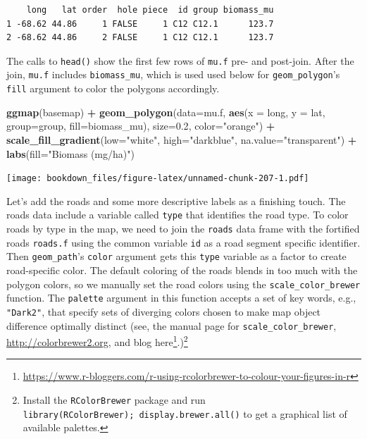 \documentclass[
]{krantz}
\makeatletter
\newenvironment{Shaded}{\begin{snugshade}}{\end{snugshade}}
\newcommand{\DataTypeTok}[1]{\textcolor[rgb]{0.27,0.27,0.27}{#1}}
\newcommand{\FloatTok}[1]{\textcolor[rgb]{0.06,0.06,0.06}{#1}}
\newcommand{\KeywordTok}[1]{\textcolor[rgb]{0.27,0.27,0.27}{\textbf{#1}}}
\newcommand{\NormalTok}[1]{#1}
\newcommand{\OperatorTok}[1]{\textcolor[rgb]{0.43,0.43,0.43}{\textbf{#1}}}
\newcommand{\StringTok}[1]{\textcolor[rgb]{0.5,0.5,0.5}{#1}}
\renewcommand{\href}[2]{#2\footnote{\url{#1}}}
\newenvironment{kframe}{%
\medskip{}
\setlength{\fboxsep}{.8em}
 \def\at@end@of@kframe{}%
 \ifinner\ifhmode%
  \def\at@end@of@kframe{\end{minipage}}%
  \begin{minipage}{\columnwidth}%
 \fi\fi%
 \def\FrameCommand##1{\hskip\@totalleftmargin \hskip-\fboxsep
 \colorbox{shadecolor}{##1}\hskip-\fboxsep
     \hskip-\linewidth \hskip-\@totalleftmargin \hskip\columnwidth}%
 \MakeFramed {\advance\hsize-\width
   \@totalleftmargin\z@ \linewidth\hsize
   \@setminipage}}%
 {\par\unskip\endMakeFramed%
 \at@end@of@kframe}
\renewenvironment{Shaded}{\begin{kframe}}{\end{kframe}}
\makeatother
\begin{document}
\begin{verbatim}
    long   lat order  hole piece  id group biomass_mu
1 -68.62 44.86     1 FALSE     1 C12 C12.1      123.7
2 -68.62 44.86     2 FALSE     1 C12 C12.1      123.7
\end{verbatim}

The calls to \texttt{head()} show the first few rows of \texttt{mu.f} pre- and post-join. After the join, \texttt{mu.f} includes \texttt{biomass\_mu}, which is used used below for \texttt{geom\_polygon}'s \texttt{fill} argument to color the polygons accordingly.

\begin{Shaded}
\begin{Highlighting}[]
\KeywordTok{ggmap}\NormalTok{(basemap) }\OperatorTok{+}
\StringTok{    }\KeywordTok{geom\_polygon}\NormalTok{(}\DataTypeTok{data=}\NormalTok{mu.f, }\KeywordTok{aes}\NormalTok{(}\DataTypeTok{x =}\NormalTok{ long, }\DataTypeTok{y =}\NormalTok{ lat, }
                                \DataTypeTok{group=}\NormalTok{group, }\DataTypeTok{fill=}\NormalTok{biomass\_mu), }
                 \DataTypeTok{size=}\FloatTok{0.2}\NormalTok{, }\DataTypeTok{color=}\StringTok{"orange"}\NormalTok{) }\OperatorTok{+}
\StringTok{    }\KeywordTok{scale\_fill\_gradient}\NormalTok{(}\DataTypeTok{low=}\StringTok{"white"}\NormalTok{, }\DataTypeTok{high=}\StringTok{"darkblue"}\NormalTok{, }
                        \DataTypeTok{na.value=}\StringTok{"transparent"}\NormalTok{) }\OperatorTok{+}
\StringTok{    }\KeywordTok{labs}\NormalTok{(}\DataTypeTok{fill=}\StringTok{"Biomass (mg/ha)"}\NormalTok{)}
\end{Highlighting}
\end{Shaded}

\texttt{[image: bookdown\_files/figure-latex/unnamed-chunk-207-1.pdf]}

Let's add the roads and some more descriptive labels as a finishing touch. The roads data include a variable called \texttt{type} that identifies the road type. To color roads by type in the map, we need to join the \texttt{roads} data frame with the fortified roads \texttt{roads.f} using the common variable \texttt{id} as a road segment specific identifier. Then \texttt{geom\_path}'s \texttt{color} argument gets this \texttt{type} variable as a factor to create road-specific color. The default coloring of the roads blends in too much with the polygon colors, so we manually set the road colors using the \texttt{scale\_color\_brewer} function. The \texttt{palette} argument in this function accepts a set of key words, e.g., \texttt{"Dark2"}, that specify sets of diverging colors chosen to make map object difference optimally distinct (see, the manual page for \texttt{scale\_color\_brewer}, \url{http://colorbrewer2.org}, and blog \href{https://www.r-bloggers.com/r-using-rcolorbrewer-to-colour-your-figures-in-r}{here}.)\footnote{Install the \texttt{RColorBrewer} package and run \texttt{library(RColorBrewer);\ display.brewer.all()} to get a graphical list of available palettes.}
\end{document}
